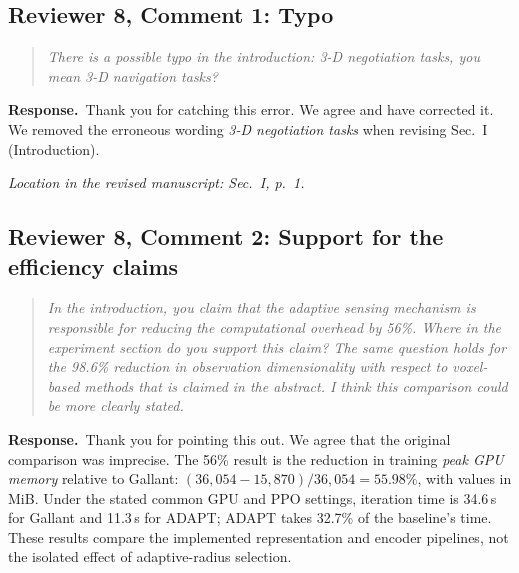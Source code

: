 \documentclass[11pt]{article}
\newenvironment{reviewcomment}{\begin{quote}\color{reviewblue}\itshape}{\end{quote}}
\newcommand{\Response}{\par\noindent\textbf{Response.}\ }
\newcommand{\Location}[1]{\par\noindent\textit{Location in the revised manuscript: #1}}
\begin{document}
\subsection*{Reviewer 8, Comment 1: Typo}
\begin{reviewcomment}
There is a possible typo in the introduction: 3-D negotiation tasks, you mean 3-D navigation tasks?
\end{reviewcomment}
\Response Thank you for catching this error. We agree and have corrected it. We removed the erroneous wording \textit{3-D negotiation tasks} when revising Sec.~I (Introduction).
\Location{Sec.~I, p.~1.}



\subsection*{Reviewer 8, Comment 2: Support for the efficiency claims}
\begin{reviewcomment}
In the introduction, you claim that the adaptive sensing mechanism is responsible for reducing the computational overhead by 56\%. Where in the experiment section do you support this claim? The same question holds for the 98.6\% reduction in observation dimensionality with respect to voxel-based methods that is claimed in the abstract. I think this comparison could be more clearly stated.
\end{reviewcomment}
\Response Thank you for pointing this out. We agree that the original comparison was imprecise. The 56\% result is the reduction in training \emph{peak GPU memory} relative to Gallant: $(36{,}054-15{,}870)/36{,}054=55.98\%$, with values in MiB. Under the stated common GPU and PPO settings, iteration time is 34.6\,s for Gallant and 11.3\,s for ADAPT; ADAPT takes 32.7\% of the baseline's time. These results compare the implemented representation and encoder pipelines, not the isolated effect of adaptive-radius selection.
\end{document}
